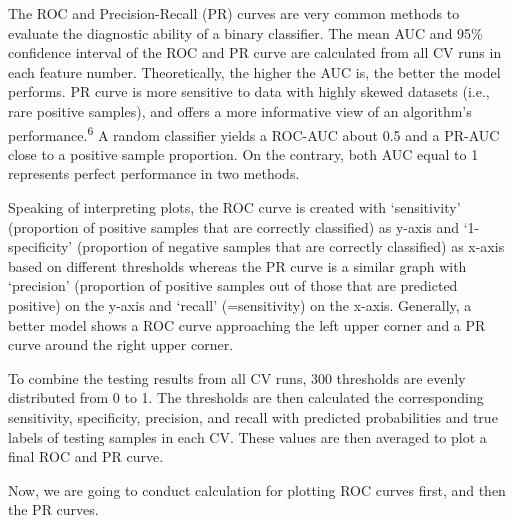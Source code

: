 \documentclass[]{article}
\begin{document}
The ROC and Precision-Recall (PR) curves are very common methods to evaluate the diagnostic ability of a binary classifier. The mean AUC and 95\% confidence interval of the ROC and PR curve are calculated from all CV runs in each feature number. Theoretically, the higher the AUC is, the better the model performs. PR curve is more sensitive to data with highly skewed datasets (i.e., rare positive samples), and offers a more informative view of an algorithm's performance.\textsuperscript{6} A random classifier yields a ROC-AUC about 0.5 and a PR-AUC close to a positive sample proportion. On the contrary, both AUC equal to 1 represents perfect performance in two methods.

Speaking of interpreting plots, the ROC curve is created with `sensitivity' (proportion of positive samples that are correctly classified) as y-axis and `1-specificity' (proportion of negative samples that are correctly classified) as x-axis based on different thresholds whereas the PR curve is a similar graph with `precision' (proportion of positive samples out of those that are predicted positive) on the y-axis and `recall' (=sensitivity) on the x-axis. Generally, a better model shows a ROC curve approaching the left upper corner and a PR curve around the right upper corner.

To combine the testing results from all CV runs, 300 thresholds are evenly distributed from 0 to 1. The thresholds are then calculated the corresponding sensitivity, specificity, precision, and recall with predicted probabilities and true labels of testing samples in each CV. These values are then averaged to plot a final ROC and PR curve.

Now, we are going to conduct calculation for plotting ROC curves first, and then the PR curves.
\end{document}
